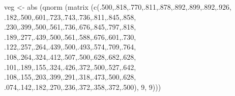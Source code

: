\documentclass[
  12pt,
  letterpaper,
  DIV=11,
  numbers=noendperiod]{scrreprt}
\newenvironment{Shaded}{\begin{snugshade}}{\end{snugshade}}
\newcommand{\DecValTok}[1]{\textcolor[rgb]{0.68,0.00,0.00}{#1}}
\newcommand{\FunctionTok}[1]{\textcolor[rgb]{0.28,0.35,0.67}{#1}}
\newcommand{\NormalTok}[1]{\textcolor[rgb]{0.00,0.23,0.31}{#1}}
\newcommand{\OtherTok}[1]{\textcolor[rgb]{0.00,0.23,0.31}{#1}}
\theoremstyle{remark}
\begin{document}
\begin{Shaded}
\begin{Highlighting}[]
\NormalTok{veg }\OtherTok{\textless{}{-}} \FunctionTok{abs}\NormalTok{ (}\FunctionTok{qnorm}\NormalTok{ (}\FunctionTok{matrix}\NormalTok{ (}\FunctionTok{c}\NormalTok{(.}\DecValTok{500}\NormalTok{,.}\DecValTok{818}\NormalTok{,.}\DecValTok{770}\NormalTok{,.}\DecValTok{811}\NormalTok{,.}\DecValTok{878}\NormalTok{,.}\DecValTok{892}\NormalTok{,.}\DecValTok{899}\NormalTok{,.}\DecValTok{892}\NormalTok{,.}\DecValTok{926}\NormalTok{,}
\NormalTok{.}\DecValTok{182}\NormalTok{,.}\DecValTok{500}\NormalTok{,.}\DecValTok{601}\NormalTok{,.}\DecValTok{723}\NormalTok{,.}\DecValTok{743}\NormalTok{,.}\DecValTok{736}\NormalTok{,.}\DecValTok{811}\NormalTok{,.}\DecValTok{845}\NormalTok{,.}\DecValTok{858}\NormalTok{,}
\NormalTok{.}\DecValTok{230}\NormalTok{,.}\DecValTok{399}\NormalTok{,.}\DecValTok{500}\NormalTok{,.}\DecValTok{561}\NormalTok{,.}\DecValTok{736}\NormalTok{,.}\DecValTok{676}\NormalTok{,.}\DecValTok{845}\NormalTok{,.}\DecValTok{797}\NormalTok{,.}\DecValTok{818}\NormalTok{,}
\NormalTok{.}\DecValTok{189}\NormalTok{,.}\DecValTok{277}\NormalTok{,.}\DecValTok{439}\NormalTok{,.}\DecValTok{500}\NormalTok{,.}\DecValTok{561}\NormalTok{,.}\DecValTok{588}\NormalTok{,.}\DecValTok{676}\NormalTok{,.}\DecValTok{601}\NormalTok{,.}\DecValTok{730}\NormalTok{,}
\NormalTok{.}\DecValTok{122}\NormalTok{,.}\DecValTok{257}\NormalTok{,.}\DecValTok{264}\NormalTok{,.}\DecValTok{439}\NormalTok{,.}\DecValTok{500}\NormalTok{,.}\DecValTok{493}\NormalTok{,.}\DecValTok{574}\NormalTok{,.}\DecValTok{709}\NormalTok{,.}\DecValTok{764}\NormalTok{,}
\NormalTok{.}\DecValTok{108}\NormalTok{,.}\DecValTok{264}\NormalTok{,.}\DecValTok{324}\NormalTok{,.}\DecValTok{412}\NormalTok{,.}\DecValTok{507}\NormalTok{,.}\DecValTok{500}\NormalTok{,.}\DecValTok{628}\NormalTok{,.}\DecValTok{682}\NormalTok{,.}\DecValTok{628}\NormalTok{,}
\NormalTok{.}\DecValTok{101}\NormalTok{,.}\DecValTok{189}\NormalTok{,.}\DecValTok{155}\NormalTok{,.}\DecValTok{324}\NormalTok{,.}\DecValTok{426}\NormalTok{,.}\DecValTok{372}\NormalTok{,.}\DecValTok{500}\NormalTok{,.}\DecValTok{527}\NormalTok{,.}\DecValTok{642}\NormalTok{,}
\NormalTok{.}\DecValTok{108}\NormalTok{,.}\DecValTok{155}\NormalTok{,.}\DecValTok{203}\NormalTok{,.}\DecValTok{399}\NormalTok{,.}\DecValTok{291}\NormalTok{,.}\DecValTok{318}\NormalTok{,.}\DecValTok{473}\NormalTok{,.}\DecValTok{500}\NormalTok{,.}\DecValTok{628}\NormalTok{,}
\NormalTok{.}\DecValTok{074}\NormalTok{,.}\DecValTok{142}\NormalTok{,.}\DecValTok{182}\NormalTok{,.}\DecValTok{270}\NormalTok{,.}\DecValTok{236}\NormalTok{,.}\DecValTok{372}\NormalTok{,.}\DecValTok{358}\NormalTok{,.}\DecValTok{372}\NormalTok{,.}\DecValTok{500}\NormalTok{), }\DecValTok{9}\NormalTok{, }\DecValTok{9}\NormalTok{)))}
\end{Highlighting}
\end{Shaded}
\end{document}
